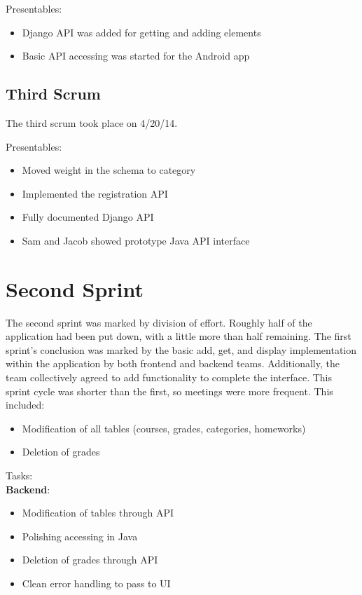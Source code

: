 \documentclass[a4paper]{article} %
\begin{document}
Presentables:
\begin{itemize}
  \item Django API was added for getting and adding elements
    \item Basic API accessing was started for the Android app
\end{itemize}

%
%

\subsection{Third Scrum} \label{First Sprint Third Scrum}

The third scrum took place on 4/20/14.

Presentables:
\begin{itemize}
  \item Moved weight in the schema to category
    \item Implemented the registration API
    \item Fully documented Django API
    \item Sam and Jacob showed prototype Java API interface
\end{itemize}

\section{Second Sprint}

The second sprint was marked by division of effort. Roughly half of the application had been put down, with a little more than half remaining. The first sprint's conclusion was marked by the basic add, get, and display implementation within the application by both frontend and backend teams. Additionally, the team collectively agreed to add functionality to complete the interface. This sprint cycle was shorter than the first, so meetings were more frequent. This included:

\begin{itemize}
  \item Modification of all tables (courses, grades, categories, homeworks)
    \item Deletion of grades
\end{itemize}

Tasks: \\

\textbf{Backend}:
\begin{itemize}
  \item Modification of tables through API
    \item Polishing accessing in Java
    \item Deletion of grades through API
    \item Clean error handling to pass to UI
\end{itemize}
\end{document}
